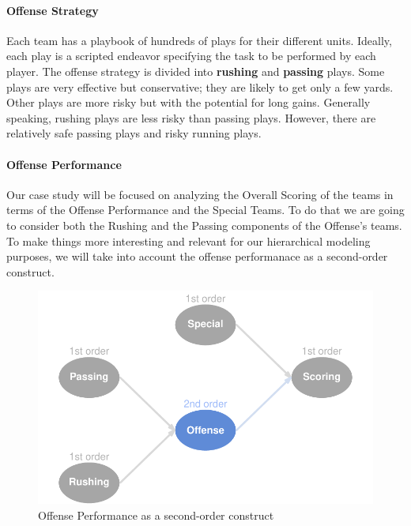 \documentclass[12pt]{book}\usepackage{graphicx, color}
\newenvironment{knitrout}{}{} %
\begin{document}
\paragraph{Offense Strategy}
Each team has a playbook of hundreds of plays for their different units. Ideally, each play is a scripted endeavor specifying the task to be performed by each player. The offense strategy is divided into \textbf{rushing} and \textbf{passing} plays. Some plays are very effective but conservative; they are likely to get only a few yards. Other plays are more risky but with the potential for long gains. Generally speaking, rushing plays are less risky than passing plays. However, there are relatively safe passing plays and risky running plays. 

\paragraph{Offense Performance}
Our case study will be focused on analyzing the Overall Scoring of the teams in terms of the Offense Performance and the Special Teams. To do that we are going to consider both the Rushing and the Passing components of the Offense's teams. To make things more interesting and relevant for our hierarchical modeling purposes, we will take into account the offense performanace as a second-order construct.
\begin{knitrout}
\color{fgcolor}\begin{figure}[h]


{\centering \includegraphics[width=.9\linewidth,height=.45\linewidth]{figure/offense_performance_model} 

}

\caption[Offense Performance as a second-order construct]{Offense Performance as a second-order construct\label{fig:offense_performance_model}}
\end{figure}


\end{knitrout}
\end{document}
